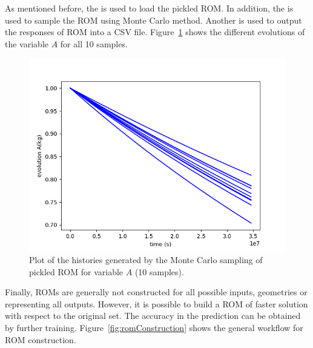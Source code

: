 As mentioned before, the  is used to load the pickled ROM. In addition, the  is
used to sample the ROM using Monte Carlo method. Another  is used to output the responses of ROM
into a CSV file. Figure~\ref{fig:historiesROMPlotLine_A} shows the different evolutions of the variable $A$ for
all 10 samples.

\begin{figure}[h!]
  \centering
  \includegraphics[scale=0.7]{../../tests/framework/user_guide/ravenTutorial/gold/ROMLoad/1-historyROMPlot_line.png}
  \caption{Plot of the histories generated by the Monte Carlo sampling of pickled ROM for variable $A$ (10 samples).}
  \label{fig:historiesROMPlotLine_A}
\end{figure}

Finally, ROMs are generally not constructed for all possible inputs, geometries or representing all outputs. However,
it is possible to build a ROM of faster solution with respect to the original set. The accuracy in the prediction
can be obtained by further training. Figure~\ref{fig:romConstruction} shows the general workflow for ROM construction.


